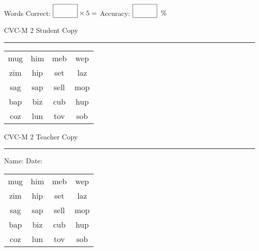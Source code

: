 \documentclass{memoir}
\begin{document}
\small

Words Correct: $\fbox{\phantom{\huge 100}} \times 5 = $ Accuracy: $\fbox{\phantom{\huge 100}}\;\; \%$ 

\vfill

\newpage


\footnotesize \noindent
CVC-M 2 \hfill Student Copy
\smallskip
\hrule

\Large

\setlength{\tabcolsep}{14pt}
\def\arraystretch{2}

{\selectfont


\begin{vplace}[0.5]
\begin{center}
\begin{tabular}{cccc}
mug & him & meb & wep \\
zim & hip & set & laz \\
sag & sap & sell & mop \\
bap & biz & cub & hup \\
coz & lun & tov & sob \\
\end{tabular}
\end{center}
\end{vplace}

}

\newpage

\footnotesize \noindent
CVC-M 2 \hfill Teacher Copy
\smallskip
\hrule

\small

\vfill

\noindent
Name: \underline{\hspace{1.75in}} \hfill Date: \underline{\hspace{1in}}

\Large

{\selectfont


\begin{vplace}[0.5]
\begin{center}
\begin{tabular}{cccc}
mug & him & meb & wep \\
zim & hip & set & laz \\
sag & sap & sell & mop \\
bap & biz & cub & hup \\
coz & lun & tov & sob \\
\end{tabular}
\end{center}
\end{vplace}



}
\end{document}
